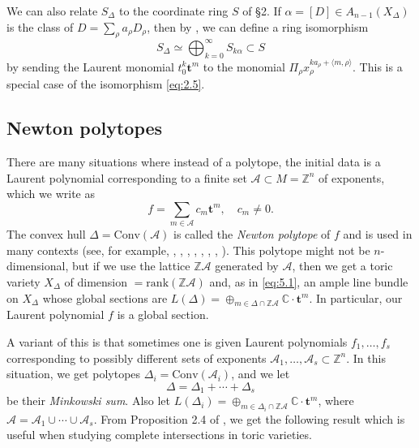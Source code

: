 \documentclass{amsart}
\theoremstyle{plain}
\theoremstyle{definition}
\begin{document}
	We can also relate $S_\Delta$ to the coordinate ring $S$ of
\S2.  If $\alpha = [D] \in A_{n-1}(X_\Delta)$ is the class of $D =
\sum_\rho a_\rho D_\rho$, then by \cite{BC}, we can define a ring
isomorphism
\begin{equation}
S_\Delta \simeq \bigoplus_{k=0}^\infty S_{k\alpha} \subset S
\tag{5.3}\label{eq:5.3}
\end{equation}
by sending the Laurent monomial $t_0^k\mathbf{t}^m$ to the monomial
$\Pi_\rho x_\rho^{ka_\rho +\langle m,\rho\rangle}$.  This is a special
case of the isomorphism \eqref{eq:2.5}.

	\subsection{Newton polytopes} There are many situations
where instead of a polytope, the initial data is a Laurent polynomial
corresponding to a finite set $\mathcal{A} \subset M = \mathbb{Z}^n$ of
exponents, which we write as
\[
f = \sum_{m \in \mathcal{A}} c_m \mathbf{t}^m,\quad c_m \ne 0.
\]
The convex hull $\Delta = \mathrm{Conv}(\mathcal{A})$ is called the {\it
Newton polytope\/} of $f$ and is used in many contexts (see, for
example, \cite{AVG}, \cite{Dan3}, \cite{DL}, \cite{GKZ1}, \cite{Kho},
\cite{Kus}, \cite{McD}, \cite{Var}).  This polytope might not be
$n$-dimensional, but if we use the lattice $\mathbb{Z}\mathcal{A}$ generated
by $\mathcal{A}$, then we get a toric variety $X_\Delta$ of dimension $=
\mathrm{rank}(\mathbb{Z}\mathcal{A})$ and, as in \eqref{eq:5.1}, an ample line
bundle on $X_\Delta$ whose global sections are $L(\Delta) =
\oplus_{m\in\Delta\cap\mathbb{Z}\mathcal{A}} \mathbb{C}\cdot \mathbf{t}^m$.  In
particular, our Laurent polynomial $f$ is a global section.

	A variant of this is that sometimes one is given Laurent
polynomials $f_1,\dots,f_s$ corresponding to possibly different sets
of exponents $\mathcal{A}_1,\dots,\mathcal{A}_s \subset \mathbb{Z}^n$.  In this
situation, we get polytopes $\Delta_i = \mathrm{Conv}(\mathcal{A}_i)$, and
we let
\begin{equation}
\Delta = \Delta_1 + \cdots + \Delta_s
\tag{5.4}\label{eq:5.4}
\end{equation}
be their {\it Minkowski sum\/}.  Also let $L(\Delta_i) =
\oplus_{m\in\Delta_i\cap\mathbb{Z}\mathcal{A}} \mathbb{C}\cdot \mathbf{t}^m$,
where $\mathcal{A} = \mathcal{A}_1\cup\cdots\cup\mathcal{A}_s$.  From Proposition
2.4 of \cite{BB3}, we get the following result which is useful when
studying complete intersections in toric varieties.
\end{document}
